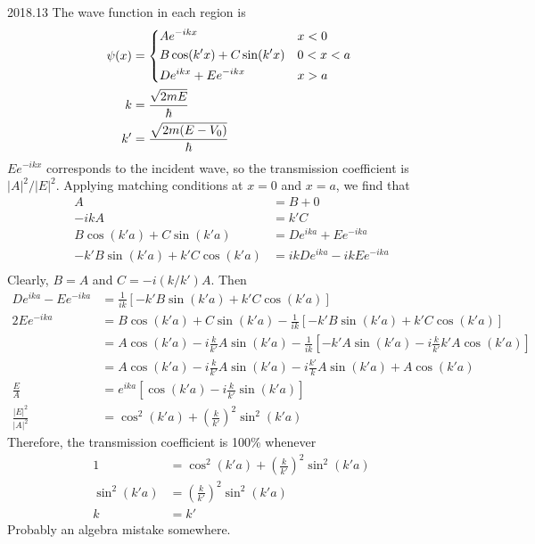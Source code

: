 \documentclass[12pt]{article}
\begin{document}
\begin{solution}{2018.13}
The wave function in each region is
\begin{align*}
\psi(x) & = \begin{dcases*}
A e^{-ikx} & $x < 0$ \\
B \cos (k' x) + C \sin (k' x) & $0 < x < a$ \\
D e^{ik x} + E e^{-ik x} & $x > a$
\end{dcases*} \\
k & = \frac{\sqrt{2mE}}{\hbar} \\
k' & = \frac{\sqrt{2m(E-V_0)}}{\hbar}
\end{align*}
$E e^{-ikx}$ corresponds to the incident wave, so the transmission coefficient is
$\left| A \right|^2 / \left| E \right|^2$.
Applying matching conditions at $x=0$ and $x=a$, we find that
\begin{align*}
A & = B + 0 \\
-ikA & = k' C \\
B \cos (k' a) + C \sin (k'a) & = D e^{ika} + E e^{-ika} \\
-k'B \sin (k' a) + k' C \cos (k'a) & = ik D e^{ika} - ikE e^{-ika} \\
\end{align*}
Clearly, $B = A$ and $C = -i(k/k') A$. Then
\begin{align*}
D e^{ika} - E e^{-ika} 
& = \frac{1}{ik} \left[ -k'B \sin (k' a) + k' C \cos (k'a) \right] \\
2E e^{-ika} & = B \cos (k'a) + C \sin (k' a) 
- \frac{1}{ik} \left[ -k'B \sin (k' a) + k' C \cos (k'a) \right] \\
& = A \cos (k'a) - i \frac{k}{k'} A \sin (k' a) 
- \frac{1}{ik} \left[ -k'A \sin (k' a) - i \frac{k}{k'} k' A \cos (k'a) \right] \\
& = A \cos (k'a) - i \frac{k}{k'} A \sin (k' a) 
-i \frac{k'}{k} A \sin (k' a) + A \cos (k'a) \\
\frac{E}{A} & = e^{ika} \left[ \cos (k'a) - i \frac{k}{k'} \sin (k' a) \right] \\
\frac{\left| E \right|^2}{\left| A \right|^2} & = \cos^2 (k'a) + \left( \frac{k}{k'} \right)^2 \sin^2 (k'a)
\end{align*}
Therefore, the transmission coefficient is 100\% whenever
\begin{align*}
1 & = \cos^2 (k'a) + \left( \frac{k}{k'} \right)^2 \sin^2 (k'a) \\
\sin^2 (k' a) & = \left( \frac{k}{k'} \right)^2 \sin^2 (k'a) \\
k & = k'
\end{align*}
Probably an algebra mistake somewhere.
\end{solution}
\end{document}
